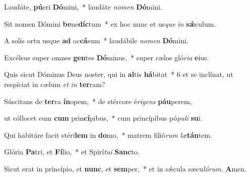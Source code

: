 \item Laudáte, \textbf{pú}eri \textbf{Dó}mini,~* laudáte \textit{no}\textit{men} \textbf{Dó}mini.

\item Sit nomen Dómini \textbf{be}ne\textbf{díc}tum~* ex hoc nunc et us\textit{que} \textit{in} \textbf{sǽ}culum.

\item A solis ortu usque \textbf{ad} oc\textbf{cá}sum~* laudábile \textit{no}\textit{men} \textbf{Dó}mini.

\item Excélsus super omnes \textbf{gen}tes \textbf{Dó}minus,~* super cælos gló\textit{ri}\textit{a} \textbf{e}ius.

\item Quis sicut Dóminus Deus noster, qui in \textbf{al}tis \textbf{há}bitat~* 6 et se inclínat, ut respíciat in cælum \textit{et} \textit{in} \textbf{ter}ram?

\item Súscitans de \textbf{ter}ra \textbf{ín}opem,~* de stércore é\textit{ri}\textit{gens} \textbf{páu}perem,

\item ut cóllocet eum \textbf{cum} prin\textbf{cí}pibus,~* cum princípibus pó\textit{pu}\textit{li} \textbf{su}i.

\item Qui habitáre facit stéri\textbf{lem} in \textbf{do}mo,~* matrem filió\textit{rum} \textit{læ}\textbf{tán}tem.

\item Glória \textbf{Pa}tri, et \textbf{Fí}lio,~* et Spirí\textit{tu}\textit{i} \textbf{Sanc}to.

\item Sicut erat in princípio, et \textbf{nunc}, et \textbf{sem}per,~* et in sǽcula sæcu\textit{ló}\textit{rum}. \textbf{A}men.